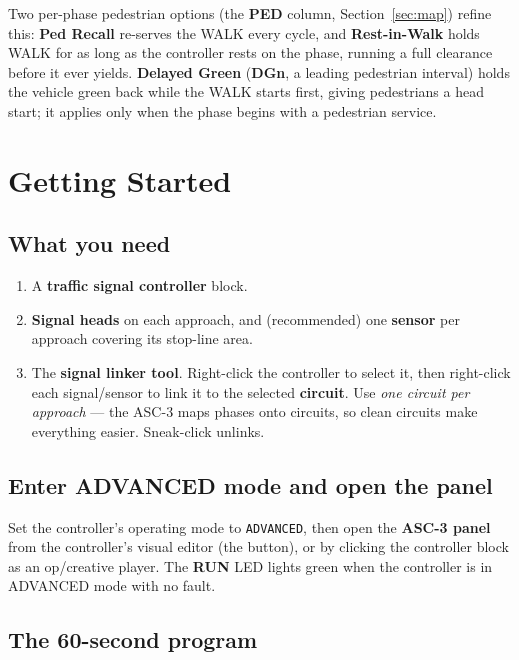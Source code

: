 \documentclass[11pt]{article}
\newcommand{\field}[1]{\textsf{\textbf{#1}}}
\newcommand{\key}[1]{\fcolorbox{inkhead}{gray!12}{\small\textsf{#1}}}
\begin{document}
Two per-phase pedestrian options (the \field{PED} column, Section~\ref{sec:map})
refine this: \textbf{Ped Recall} re-serves the WALK every cycle, and
\textbf{Rest-in-Walk} holds WALK for as long as the controller rests on the phase,
running a full clearance before it ever yields. \textbf{Delayed Green}
(\field{DGn}, a leading pedestrian interval) holds the vehicle green back while the
WALK starts first, giving pedestrians a head start; it applies only when the phase
begins with a pedestrian service.

\section{Getting Started}\label{sec:start}

\subsection{What you need}

\begin{enumerate}[nosep]
  \item A \textbf{traffic signal controller} block.
  \item \textbf{Signal heads} on each approach, and (recommended) one
        \textbf{sensor} per approach covering its stop-line area.
  \item The \textbf{signal linker tool}. Right-click the controller to select it,
        then right-click each signal/sensor to link it to the selected
        \textbf{circuit}. Use \emph{one circuit per approach} — the ASC-3 maps
        phases onto circuits, so clean circuits make everything easier.
        Sneak-click unlinks.
\end{enumerate}

\subsection{Enter ADVANCED mode and open the panel}

Set the controller's operating mode to \texttt{ADVANCED}, then open the
\textbf{ASC-3 panel} from the controller's visual editor (the \key{ASC-3} button),
or by clicking the controller block as an op/creative player. The \textbf{RUN} LED
lights green when the controller is in ADVANCED mode with no fault.

\subsection{The 60-second program}
\end{document}
